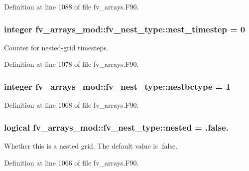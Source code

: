 Definition at line 1088 of file fv\-\_\-arrays.\-F90.

\subsubsection[{nest\-\_\-timestep}]{\setlength{\rightskip}{0pt plus 5cm}integer fv\-\_\-arrays\-\_\-mod\-::fv\-\_\-nest\-\_\-type\-::nest\-\_\-timestep = 0}\label{structfv__arrays__mod_1_1fv__nest__type_ac784733ccc09f7037078b71074727228}


Counter for nested-\/grid timesteps. 



Definition at line 1078 of file fv\-\_\-arrays.\-F90.

\subsubsection[{nestbctype}]{\setlength{\rightskip}{0pt plus 5cm}integer fv\-\_\-arrays\-\_\-mod\-::fv\-\_\-nest\-\_\-type\-::nestbctype = 1}\label{structfv__arrays__mod_1_1fv__nest__type_adc7be956d3d3a5111c23c80548f87587}


Definition at line 1068 of file fv\-\_\-arrays.\-F90.

\subsubsection[{nested}]{\setlength{\rightskip}{0pt plus 5cm}logical fv\-\_\-arrays\-\_\-mod\-::fv\-\_\-nest\-\_\-type\-::nested = .false.}\label{structfv__arrays__mod_1_1fv__nest__type_a8f685ad8b666aa48cd72b369a3d6f7cd}


Whether this is a nested grid. The default value is .false. 



Definition at line 1066 of file fv\-\_\-arrays.\-F90.


